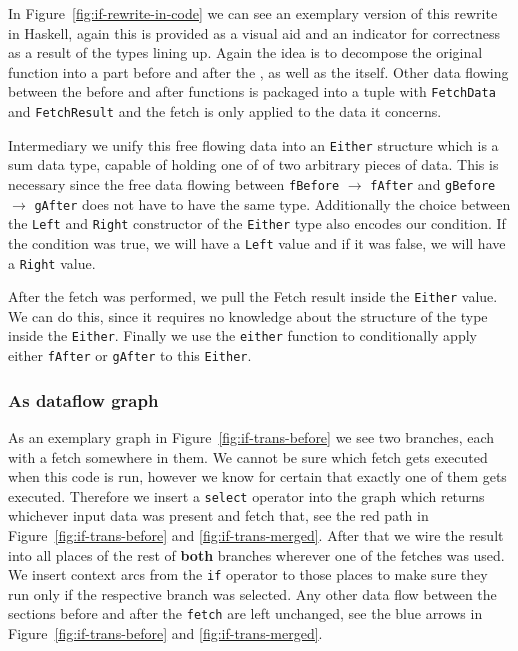 In Figure~\ref{fig:if-rewrite-in-code} we can see an exemplary version of this rewrite in Haskell, again this is provided as a visual aid and an indicator for correctness as a result of the types lining up.
Again the idea is to decompose the original function into a part before and after the \fetch{}, as well as the \fetch{} itself.
Other data flowing between the before and after functions is packaged into a tuple with \texttt{FetchData} and \texttt{FetchResult} and the fetch is only applied to the data it concerns.

Intermediary we unify this free flowing data into an \texttt{Either} structure which is a sum data type, capable of holding one of of two arbitrary pieces of data.
This is necessary since the free data flowing between \texttt{fBefore} $\rightarrow$ \texttt{fAfter} and \texttt{gBefore} $\rightarrow$ \texttt{gAfter} does not have to have the same type.
Additionally the choice between the \texttt{Left} and \texttt{Right} constructor of the \texttt{Either} type also encodes our condition.
If the condition was true, we will have a \texttt{Left} value and if it was false, we will have a \texttt{Right} value.

After the fetch was performed, we pull the Fetch result inside the \texttt{Either} value.
We can do this, since it requires no knowledge about the structure of the type inside the \texttt{Either}.
Finally we use the \texttt{either} function to conditionally apply either \texttt{fAfter} or \texttt{gAfter} to this \texttt{Either}.

\subsubsection{As dataflow graph}

As an exemplary graph in Figure~\ref{fig:if-trans-before} we see two branches, each with a fetch somewhere in them.
We cannot be sure which fetch gets executed when this code is run, however we know for certain that exactly one of them gets executed.
Therefore we insert a \texttt{select} operator into the graph which returns whichever input data was present and fetch that, see the red path in Figure~\ref{fig:if-trans-before} and \ref{fig:if-trans-merged}.
After that we wire the result into all places of the rest of \textbf{both} branches wherever one of the fetches was used.
We insert context arcs from the \texttt{if} operator to those places to make sure they run only if the respective branch was selected.
Any other data flow between the sections before and after the \texttt{fetch} are left unchanged, see the blue arrows in Figure~\ref{fig:if-trans-before} and \ref{fig:if-trans-merged}.

